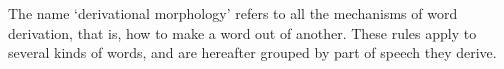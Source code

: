 The name ‘derivational morphology’ refers to all the mechanisms of word derivation, that is, how to
make a word out of another. These rules apply to several kinds of words, and are hereafter grouped
by part of speech they derive.


